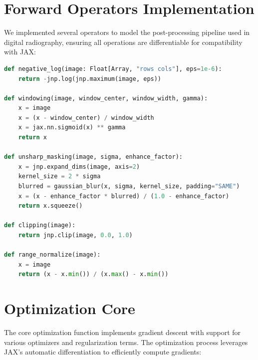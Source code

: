 \documentclass[nomenclature, english, bibtex]{kththesis}
\numberwithin{listing}{chapter}
\begin{document}
\section{Forward Operators Implementation}
We implemented several operators to model the post-processing pipeline used in digital radiography, ensuring all operations are differentiable for compatibility with JAX:

\begin{lstlisting}[language=Python, caption=Core forward operators]
def negative_log(image: Float[Array, "rows cols"], eps=1e-6):
    return -jnp.log(jnp.maximum(image, eps))

def windowing(image, window_center, window_width, gamma):
    x = image
    x = (x - window_center) / window_width
    x = jax.nn.sigmoid(x) ** gamma
    return x

def unsharp_masking(image, sigma, enhance_factor):
    x = jnp.expand_dims(image, axis=2)
    kernel_size = 2 * sigma
    blurred = gaussian_blur(x, sigma, kernel_size, padding="SAME")
    x = (x - enhance_factor * blurred) / (1.0 - enhance_factor)
    return x.squeeze()

def clipping(image):
    return jnp.clip(image, 0.0, 1.0)

def range_normalize(image):
    x = image
    return (x - x.min()) / (x.max() - x.min())
\end{lstlisting}

\section{Optimization Core}
The core optimization function implements gradient descent with support for various optimizers and regularization terms. The optimization process leverages JAX's automatic differentiation to efficiently compute gradients:
\end{document}
